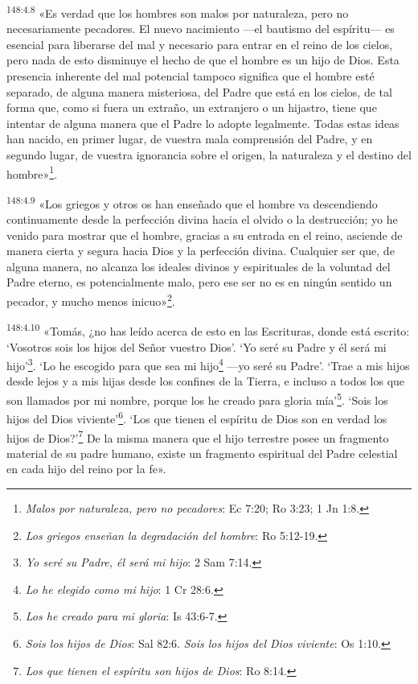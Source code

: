 \par 
\textsuperscript{148:4.8} «Es verdad que los hombres son malos por naturaleza, pero no necesariamente pecadores. El nuevo nacimiento ---el bautismo del espíritu--- es esencial para liberarse del mal y necesario para entrar en el reino de los cielos, pero nada de esto disminuye el hecho de que el hombre es un hijo de Dios. Esta presencia inherente del mal potencial tampoco significa que el hombre esté separado, de alguna manera misteriosa, del Padre que está en los cielos, de tal forma que, como si fuera un extraño, un extranjero o un hijastro, tiene que intentar de alguna manera que el Padre lo adopte legalmente. Todas estas ideas han nacido, en primer lugar, de vuestra mala comprensión del Padre, y en segundo lugar, de vuestra ignorancia sobre el origen, la naturaleza y el destino del hombre»\footnote{\textit{Malos por naturaleza, pero no pecadores}: Ec 7:20; Ro 3:23; 1 Jn 1:8.}.

\par 
\textsuperscript{148:4.9} «Los griegos y otros os han enseñado que el hombre va descendiendo continuamente desde la perfección divina hacia el olvido o la destrucción; yo he venido para mostrar que el hombre, gracias a su entrada en el reino, asciende de manera cierta y segura hacia Dios y la perfección divina. Cualquier ser que, de alguna manera, no alcanza los ideales divinos y espirituales de la voluntad del Padre eterno, es potencialmente malo, pero ese ser no es en ningún sentido un pecador, y mucho menos inicuo»\footnote{\textit{Los griegos enseñan la degradación del hombre}: Ro 5:12-19.}.

\par 
\textsuperscript{148:4.10} «Tomás, ¿no has leído acerca de esto en las Escrituras, donde está escrito: `Vosotros sois los hijos del Señor vuestro Dios'. `Yo seré su Padre y él será mi hijo'\footnote{\textit{Yo seré su Padre, él será mi hijo}: 2 Sam 7:14.}. `Lo he escogido para que sea mi hijo\footnote{\textit{Lo he elegido como mi hijo}: 1 Cr 28:6.} ---yo seré su Padre'. `Trae a mis hijos desde lejos y a mis hijas desde los confines de la Tierra, e incluso a todos los que son llamados por mi nombre, porque los he creado para gloria mía'\footnote{\textit{Los he creado para mi gloria}: Is 43:6-7.}. `Sois los hijos del Dios viviente'\footnote{\textit{Sois los hijos de Dios}: Sal 82:6. \textit{Sois los hijos del Dios viviente}: Os 1:10.}. `Los que tienen el espíritu de Dios son en verdad los hijos de Dios?'\footnote{\textit{Los que tienen el espíritu son hijos de Dios}: Ro 8:14.} De la misma manera que el hijo terrestre posee un fragmento material de su padre humano, existe un fragmento espiritual del Padre celestial en cada hijo del reino por la fe».


